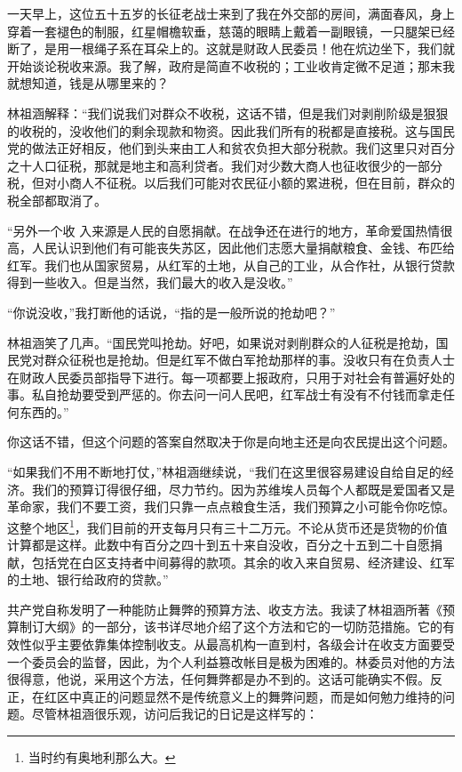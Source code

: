 \documentclass[10pt]{book}
\begin{document}
一天早上，这位五十五岁的长征老战士来到了我在外交部的房间，满面春风，身上穿着一套褪色的制服，红星帽檐软垂，慈蔼的眼睛上戴着一副眼镜，一只腿架已经断了，是用一根绳子系在耳朵上的。这就是财政人民委员！他在炕边坐下，我们就开始谈论税收来源。我了解，政府是简直不收税的；工业收肯定微不足道；那末我就想知道，钱是从哪里来的？

林祖涵解释：“我们说我们对群众不收税，这话不错，但是我们对剥削阶级是狠狠的收税的，没收他们的剩余现款和物资。因此我们所有的税都是直接税。这与国民党的做法正好相反，他们到头来由工人和贫农负担大部分税款。我们这里只对百分之十人口征税，那就是地主和高利贷者。我们对少数大商人也征收很少的一部分税，但对小商人不征税。以后我们可能对农民征小额的累进税，但在目前，群众的税全部都取消了。

“另外一个收 入来源是人民的自愿捐献。在战争还在进行的地方，革命爱国热情很高，人民认识到他们有可能丧失苏区，因此他们志愿大量捐献粮食、金钱、布匹给红军。我们也从国家贸易，从红军的土地，从自己的工业，从合作社，从银行贷款得到一些收入。但是当然，我们最大的收入是没收。”

“你说没收，”我打断他的话说，“指的是一般所说的抢劫吧？”

林祖涵笑了几声。“国民党叫抢劫。好吧，如果说对剥削群众的人征税是抢劫，国民党对群众征税也是抢劫。但是红军不做白军抢劫那样的事。没收只有在负责人士在财政人民委员部指导下进行。每一项都要上报政府，只用于对社会有普遍好处的事。私自抢劫要受到严惩的。你去问一问人民吧，红军战士有没有不付钱而拿走任何东西的。”

你这话不错，但这个问题的答案自然取决于你是向地主还是向农民提出这个问题。

“如果我们不用不断地打仗，”林祖涵继续说，“我们在这里很容易建设自给自足的经济。我们的预算订得很仔细，尽力节约。因为苏维埃人员每个人都既是爱国者又是革命家，我们不要工资，我们只靠一点点粮食生活，我们预算之小可能令你吃惊。这整个地区\footnote{当时约有奥地利那么大。}，我们目前的开支每月只有三十二万元。不论从货币还是货物的价值计算都是这样。此数中有百分之四十到五十来自没收，百分之十五到二十自愿捐献，包括党在白区支持者中间募得的款项。其余的收入来自贸易、经济建设、红军的土地、银行给政府的贷款。”

共产党自称发明了一种能防止舞弊的预算方法、收支方法。我读了林祖涵所著《预算制订大纲》的一部分，该书详尽地介绍了这个方法和它的一切防范措施。它的有效性似乎主要依靠集体控制收支。从最高机构一直到村，各级会计在收支方面要受一个委员会的监督，因此，为个人利益篡改帐目是极为困难的。林委员对他的方法很得意，他说，采用这个方法，任何舞弊都是办不到的。这话可能确实不假。反正，在红区中真正的问题显然不是传统意义上的舞弊问题，而是如何勉力维持的问题。尽管林祖涵很乐观，访问后我记的日记是这样写的：
\end{document}

